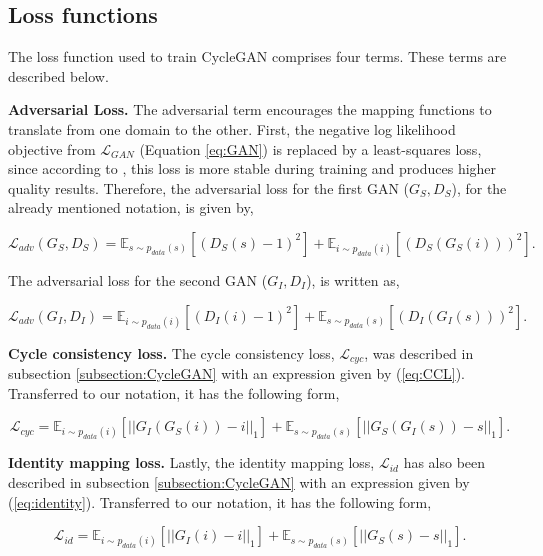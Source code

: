 \subsection*{Loss functions}

The loss function used to train CycleGAN comprises four terms. These terms are described below.

\textbf{Adversarial Loss.} The adversarial term encourages the mapping functions to translate from one domain to
the other. First, the negative log likelihood objective from $\mathcal{L}_{GAN}$  (Equation \ref{eq:GAN}) is replaced by a least-squares loss, since according to \cite{cycleGAN:original}, this loss is more stable during training and produces higher quality results. Therefore, the adversarial loss for the first GAN ($G_{S}, D_S$), for the already mentioned notation, is given by,

\begin{equation}
    \mathcal{L}_{adv}(G_{S},D_S) = \mathbb{E}_{s \sim p_{data}(s)} [(D_S(s)-1)^2] + \mathbb{E}_{i \sim p_{data}(i)} [(D_S(G_{S}(i)))^2].
\end{equation}

The adversarial loss for the second GAN ($G_{I}, D_I$), is written as,

\begin{equation}
    \mathcal{L}_{adv}(G_{I},D_I) = \mathbb{E}_{i \sim p_{data}(i)} [(D_I(i)-1)^2] + \mathbb{E}_{s \sim p_{data}(s)} [(D_I(G_{I}(s)))^2].
\end{equation}

\textbf{Cycle consistency loss.} The cycle consistency loss, $\mathcal{L}_{cyc}$, was described in subsection \ref{subsection:CycleGAN} with an expression given by (\ref{eq:CCL}). Transferred to our notation, it has the following form,

\begin{equation} 
\mathcal{L}_{cyc} = \mathbb{E}_{i \sim p_{data}(i)} [||G_{I}(G_{S}(i))-i||_1] + \mathbb{E}_{s \sim p_{data}(s)} [||G_{S}(G_{I}(s))-s||_1].
\label{eq:cly_2}
\end{equation}

\textbf{Identity mapping loss.} Lastly, the identity mapping loss, $\mathcal{L}_{id}$ has also been described in subsection \ref{subsection:CycleGAN} with an expression given by (\ref{eq:identity}). Transferred to our notation, it has the following form,

\begin{equation}
    \mathcal{L}_{id} = \mathbb{E}_{i \sim p_{data}(i)} [||G_{I}(i)-i||_1] +  \mathbb{E}_{s \sim p_{data}(s)} [||G_{S}(s)-s||_1].
\end{equation}


